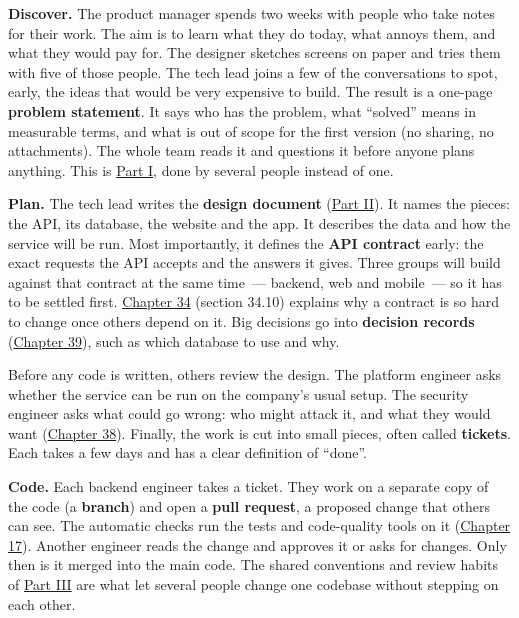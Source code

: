 \textbf{Discover.} The product manager spends two weeks with people who take notes for their work. The aim is to learn what they do today, what annoys them, and what they would pay for. The designer sketches screens on paper and tries them with five of those people. The tech lead joins a few of the conversations to spot, early, the ideas that would be very expensive to build. The result is a one-page \textbf{problem statement}. It says who has the problem, what ``solved'' means in measurable terms, and what is out of scope for the first version (no sharing, no attachments). The whole team reads it and questions it before anyone plans anything. This is \hyperref[ch:product-discovery]{Part I}, done by several people instead of one.

\textbf{Plan.} The tech lead writes the \textbf{design document} (\hyperref[ch:project-planning-guide]{Part II}). It names the pieces: the API, its database, the website and the app. It describes the data and how the service will be run. Most importantly, it defines the \textbf{API contract} early: the exact requests the API accepts and the answers it gives. Three groups will build against that contract at the same time~--- backend, web and mobile~--- so it has to be settled first. \hyperref[ch:34-response-handling]{Chapter 34} (section 34.10) explains why a contract is so hard to change once others depend on it. Big decisions go into \textbf{decision records} (\hyperref[ch:39-local-vs-production]{Chapter 39}), such as which database to use and why.

Before any code is written, others review the design. The platform engineer asks whether the service can be run on the company's usual setup. The security engineer asks what could go wrong: who might attack it, and what they would want (\hyperref[ch:38-security]{Chapter 38}). Finally, the work is cut into small pieces, often called \textbf{tickets}. Each takes a few days and has a clear definition of ``done''.

\textbf{Code.} Each backend engineer takes a ticket. They work on a separate copy of the code (a \textbf{branch}) and open a \textbf{pull request}, a proposed change that others can see. The automatic checks run the tests and code-quality tools on it (\hyperref[ch:17-build-process]{Chapter 17}). Another engineer reads the change and approves it or asks for changes. Only then is it merged into the main code. The shared conventions and review habits of \hyperref[ch:writing-good-code]{Part III} are what let several people change one codebase without stepping on each other.

